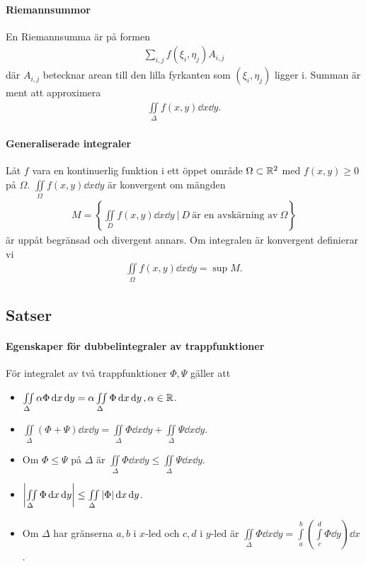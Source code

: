 \paragraph{Riemannsummor}
En Riemannsumma är på formen
\begin{align*}
	\sum_{i, j}f(\xi_i, \eta_j)A_{i, j}
\end{align*}
där $A_{i, j}$ betecknar arean till den lilla fyrkanten som $(\xi_i, \eta_j)$ ligger i. Summan är ment att approximera
\begin{align*}
	\iint\limits_{\Delta}f(x, y)\dd{x}\dd{y}.
\end{align*}

\paragraph{Generaliserade integraler}
Låt $f$ vara en kontinuerlig funktion i ett öppet område $\Omega\subset\mathbb{R}^2$ med $f(x, y)\geq 0$ på $\Omega$. $\iint\limits_{\Omega}f(x, y)\dd{x}\dd{y}$ är konvergent om mängden
\begin{align*}
	M = \left\{\iint\limits_{D}f(x, y)\dd{x}\dd{y}\ |\ D~\text{är en avskärning av}~\Omega\right\}
\end{align*}
är uppåt begränsad och divergent annars. Om integralen är konvergent definierar vi
\begin{align*}
	\iint\limits_{\Omega}f(x, y)\dd{x}\dd{y} = \sup{M}.
\end{align*}

\subsection{Satser}

\paragraph{Egenskaper för dubbelintegraler av trappfunktioner}
För integralet av två trappfunktioner $\Phi, \Psi$ gäller att
\begin{itemize}
	\item $\iint\limits_{\Delta}\alpha\Phi\dd{x}\dd{y} = \alpha\iint\limits_{\Delta}\Phi\dd{x}\dd{y}, \alpha\in\mathbb{R}$.
	\item $\iint\limits_{\Delta}(\Phi + \Psi)\dd{x}\dd{y} = \iint\limits_{\Delta}\Phi\dd{x}\dd{y} + \iint\limits_{\Delta}\Psi\dd{x}\dd{y}$.
	\item Om $\Phi\leq\Psi$ på $\Delta$ är $\iint\limits_{\Delta}\Phi\dd{x}\dd{y}\leq\iint\limits_{\Delta}\Psi\dd{x}\dd{y}$.
	\item $\abs{\iint\limits_{\Delta}\Phi\dd{x}\dd{y}}\leq\iint\limits_{\Delta}\abs{\Phi}\dd{x}\dd{y}$.
	\item Om $\Delta$ har gränserna $a, b$ i $x$-led och $c, d$ i $y$-led är $\iint\limits_{\Delta}\Phi\dd{x}\dd{y} = \int\limits_{a}^{b}\left(\int\limits_{c}^{d}\Phi\dd{y}\right)\dd{x}$.
\end{itemize}

